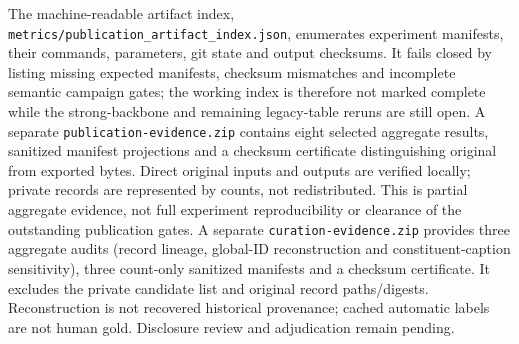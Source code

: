 \documentclass[journal]{IEEEtran}
\begin{document}
The machine-readable artifact index, \texttt{metrics/publication\_artifact\_index.json}, enumerates
experiment manifests, their commands, parameters, git state and output checksums. It fails closed by
listing missing expected manifests, checksum mismatches and incomplete semantic campaign gates; the working index is therefore not marked
complete while the strong-backbone and remaining legacy-table reruns are still open.
A separate \texttt{publication-evidence.zip} contains eight selected aggregate results,
sanitized manifest projections and a checksum certificate distinguishing original from
exported bytes. Direct original inputs and outputs are verified locally; private records
are represented by counts, not redistributed. This is partial aggregate evidence, not
full experiment reproducibility or clearance of the outstanding publication gates.
A separate \texttt{curation-evidence.zip} provides three aggregate audits (record lineage,
global-ID reconstruction and constituent-caption sensitivity), three count-only sanitized
manifests and a checksum certificate. It excludes the private candidate list and original
record paths/digests. Reconstruction is not recovered historical provenance; cached automatic
labels are not human gold. Disclosure review and adjudication remain pending.
\end{document}
